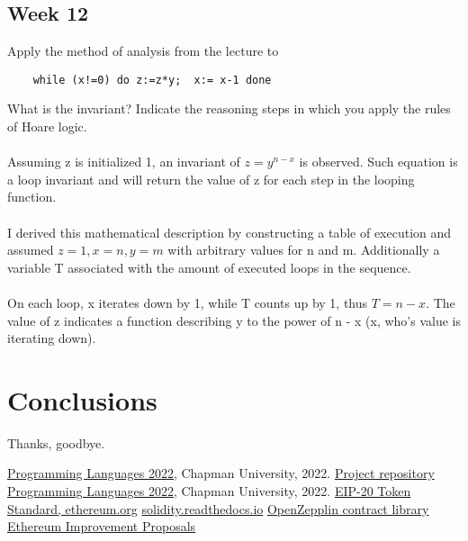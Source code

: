 \documentclass{article}
\theoremstyle{theorem}
\theoremstyle{definition}
\theoremstyle{remark}
\begin{document}
\subsection{Week 12}
Apply the method of analysis from the lecture to
\begin{verbatim}
    while (x!=0) do z:=z*y;  x:= x-1 done
\end{verbatim}

What is the invariant? Indicate the reasoning steps in which you apply the rules of Hoare logic.
\\\\
Assuming z is initialized 1, an invariant of $z=y^{n-x}$ is observed. Such equation is a loop invariant and will return the value of z for each step in the looping function. 
\\\\
I derived this mathematical description by constructing a table of execution and assumed $z = 1, x = n, y = m$ with arbitrary values for n and m. Additionally a variable T associated with the amount of executed loops in the sequence.
\\\\
On each loop, x iterates down by 1, while T counts up by 1, thus $T = n - x$. The value of z indicates a function describing y to the power of n - x (x, who's value is iterating down). 





\section{Conclusions}\label{conclusions}


Thanks, goodbye.

\begin{thebibliography}{99}
 \href{https://github.com/alexhkurz/programming-languages-2022/blob/main/README.md}{Programming Languages 2022}, Chapman University, 2022.
\href{https://github.com/tylew/354-Programming-Languages/}{Project repository} \href{https://github.com/alexhkurz/programming-languages-2022/blob/main/README.md}{Programming Languages 2022}, Chapman University, 2022.
 \href{https://eips.ethereum.org/EIPS/eip-20#abstract}{EIP-20 Token Standard, ethereum.org}
 \href{http://solidity.readthedocs.io}{ solidity.readthedocs.io}
 \href{https://github.com/OpenZeppelin/openzeppelin-contracts}{OpenZepplin contract library}
\href{https://eips.ethereum.org/}{Ethereum Improvement Proposals}

\end{thebibliography}
\end{document}
